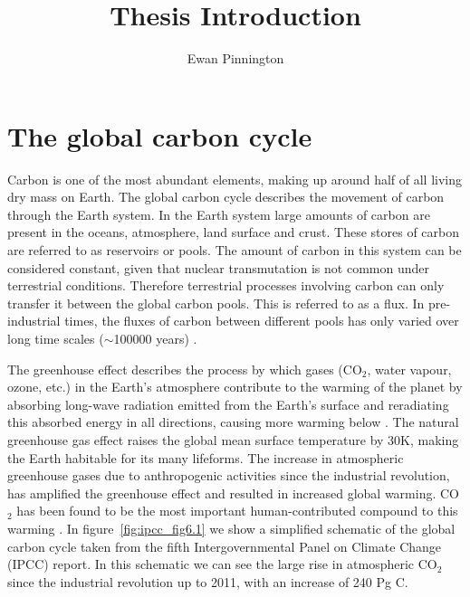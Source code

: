 \documentclass[12pt]{article}
\title{Thesis Introduction}
\author{Ewan Pinnington}
\begin{document}
\maketitle


\section{The global carbon cycle} \label{sec:global_c_cycle}

Carbon is one of the most abundant elements, making up around half of all living dry mass on Earth. The global carbon cycle describes the movement of carbon through the Earth system. In the Earth system large amounts of carbon are present in the oceans, atmosphere, land surface and crust. These stores of carbon are referred to as reservoirs or pools. The amount of carbon in this system can be considered constant, given that nuclear transmutation is not common under terrestrial conditions. Therefore terrestrial processes involving carbon can only transfer it between the global carbon pools. This is referred to as a flux. In pre-industrial times, the fluxes of carbon between different pools has only varied over long time scales (\(\sim\)100000 years) \citep{luthi2008high}.

The greenhouse effect describes the process by which gases (CO\(_{2}\), water vapour, ozone, etc.) in the Earth's atmosphere contribute to the warming of the planet by absorbing long-wave radiation emitted from the Earth's surface and reradiating this absorbed energy in all directions, causing more warming below \citep{mitchell1989greenhouse}. The natural greenhouse gas effect raises the global mean surface temperature by 30K, making the Earth habitable for its many lifeforms. The increase in atmospheric greenhouse gases due to anthropogenic activities since the industrial revolution, has amplified the greenhouse effect and resulted in increased global warming. CO\(_{2}\) has been found to be the most important human-contributed compound to this warming \citep{Falkowski291}. In figure~\ref{fig:ipcc_fig6.1} we show a simplified schematic of the global carbon cycle taken from the fifth Intergovernmental Panel on Climate Change (IPCC) report. In this schematic we can see the large rise in atmospheric CO\(_{2}\) since the industrial revolution up to 2011, with an increase of 240 Pg C.
\end{document}
